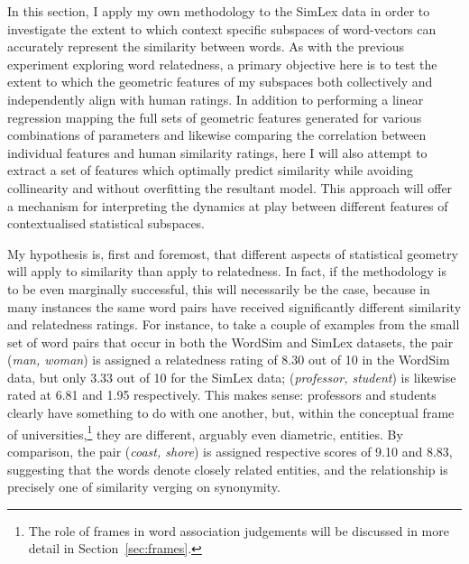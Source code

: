 In this section, I apply my own methodology to the SimLex data in order to investigate the extent to which context specific subspaces of word-vectors can accurately represent the similarity between words.  As with the previous experiment exploring word relatedness, a primary objective here is to test the extent to which the geometric features of my subspaces both collectively and independently align with human ratings.  In addition to performing a linear regression mapping the full sets of geometric features generated for various combinations of parameters and likewise comparing the correlation between individual features and human similarity ratings, here I will also attempt to extract a set of features which optimally predict similarity while avoiding collinearity and without overfitting the resultant model.  This approach will offer a mechanism for interpreting the dynamics at play between different features of contextualised statistical subspaces.

My hypothesis is, first and foremost, that different aspects of statistical geometry will apply to similarity than apply to relatedness.  In fact, if the methodology is to be even marginally successful, this will necessarily be the case, because in many instances the same word pairs have received significantly different similarity and relatedness ratings.  For instance, to take a couple of examples from the small set of word pairs that occur in both the WordSim and SimLex datasets, the pair (\emph{man, woman}) is assigned a relatedness rating of 8.30 out of 10 in the WordSim data, but only 3.33 out of 10 for the SimLex data; (\emph{professor, student}) is likewise rated at 6.81 and 1.95 respectively.  This makes sense: professors and students clearly have something to do with one another, but, within the conceptual frame of universities,\footnote{The role of frames in word association judgements will be discussed in more detail in Section~\ref{sec:frames}.} they are different, arguably even diametric, entities.  By comparison, the pair (\emph{coast, shore}) is assigned respective scores of 9.10 and 8.83, suggesting that the words denote closely related entities, and the relationship is precisely one of similarity verging on synonymity.


